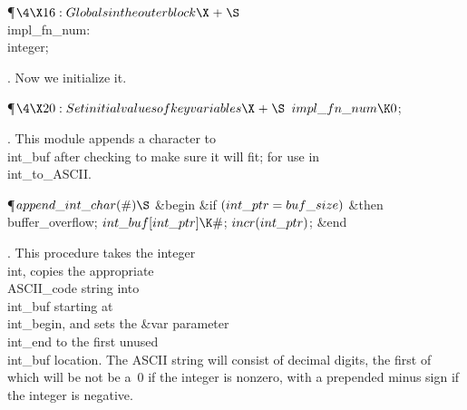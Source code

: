 \Y\P$\4\X16:Globals in the outer block\X\mathrel{+}\S$\6
\4\\{impl\_fn\_num}: \\{integer};\par
\fi

.
Now we initialize it.

\Y\P$\4\X20:Set initial values of key variables\X\mathrel{+}\S$\6
$\\{impl\_fn\_num}\K0$;\par
\fi

.
This module appends a character to \\{int\_buf} after checking to make
sure it will fit; for use in \\{int\_to\_ASCII}.

\Y\P\D {}$\\{append\_int\_char}(\#)\S$\1\6
\&{begin} \&{if} $(\\{int\_ptr}=\\{buf\_size})$ \1\&{then}\5
\\{buffer\_overflow};\2\6
$\\{int\_buf}[\\{int\_ptr}]\K\#$;\5
$\\{incr}(\\{int\_ptr})$;\6
\&{end}\2\par
\fi

.
This procedure takes the integer \\{int}, copies the appropriate
\\{ASCII\_code} string into \\{int\_buf} starting at \\{int\_begin}, and sets
the  \&{var}  parameter \\{int\_end} to the first unused \\{int\_buf} location.
The ASCII string will consist of decimal digits, the first of which
will be not be a~0 if the integer is nonzero, with a prepended minus
sign if the integer is negative.

